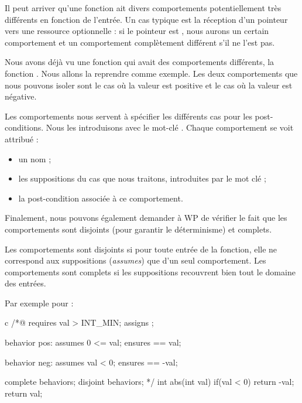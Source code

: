 Il peut arriver qu'une fonction ait divers comportements potentiellement très
différents en fonction de l'entrée. Un cas typique est la réception d'un 
pointeur vers une ressource optionnelle : si le pointeur est , nous 
aurons un certain comportement et un comportement complètement différent s'il ne 
l'est pas.



Nous avons déjà vu une fonction qui avait des comportements différents, la 
fonction . Nous allons la reprendre comme exemple. Les deux 
comportements que nous pouvons isoler sont le cas où la valeur est positive et
le cas où la valeur est négative.



Les comportements nous servent à spécifier les différents cas pour les 
post-conditions. Nous les introduisons avec le mot-clé . 
Chaque comportement se voit attribué :



\begin{itemize}
\item un nom ;
\item les suppositions du cas que nous traitons, introduites par le mot 
clé  ;
\item la post-condition associée à ce comportement.
\end{itemize}


Finalement, nous pouvons également demander à WP
de vérifier le fait que les comportements sont disjoints (pour garantir 
le déterminisme) et complets.



Les comportements sont disjoints si pour toute entrée de la fonction, elle ne
correspond aux suppositions (\textit{assumes}) que d'un seul comportement. Les 
comportements sont complets si les suppositions recouvrent bien tout le domaine
des entrées.



Par exemple pour  :



\begin{CodeBlock}{c}
/*@
  requires val > INT_MIN;
  assigns  \nothing;

  behavior pos:
    assumes 0 <= val;
    ensures \result == val;
  
  behavior neg:
    assumes val < 0;
    ensures \result == -val;
 
  complete behaviors;
  disjoint behaviors;
*/
int abs(int val){
  if(val < 0) return -val;
  return val;
}
\end{CodeBlock}



